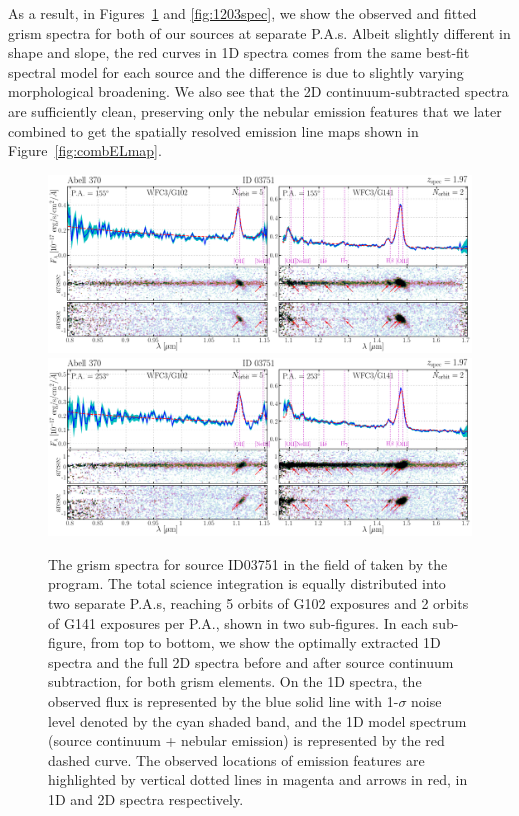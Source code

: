 As a result, in Figures~\ref{fig:3751spec} and \ref{fig:1203spec}, we show the observed and fitted grism spectra 
for both of our sources at separate P.A.s.
Albeit slightly different in shape and slope, the red curves in 1D spectra comes from the same best-fit spectral 
model for each source and the difference is due to slightly varying morphological broadening.
We also see that the 2D continuum-subtracted spectra are sufficiently clean, preserving only the nebular emission
features that we later combined to get the spatially resolved emission line maps shown in 
Figure~\ref{fig:combELmap}.

\begin{figure}
    \includegraphics[width=\textwidth]{fig/clA370_id03751_pa155_ELfig.png}
    \includegraphics[width=\textwidth]{fig/clA370_id03751_pa253_ELfig.png}
    \caption[The \hst grism spectra for source ID03751 in the field of \clsan taken by the \glass program.]
    {The \hst grism spectra for source ID03751 in the field of \clsan taken by the \glass program.
    The total science integration is equally distributed into two separate P.A.s,
    reaching 5 orbits of G102 exposures and 2 orbits of G141 exposures per P.A., shown in two sub-figures.
    In each sub-figure, from top to bottom, we show the optimally extracted 1D spectra and the full 2D spectra 
    before and after source continuum subtraction, for both grism elements.
    On the 1D spectra, the observed flux is represented by the blue solid line with 1-$\sigma$ noise level 
    denoted by the cyan shaded band, and the 1D model spectrum (source continuum + nebular emission) is 
    represented by the red dashed curve.
    The observed locations of emission features are highlighted by vertical dotted lines in magenta and arrows in 
    red, in 1D and 2D spectra respectively.
    }
    \label{fig:3751spec}
\end{figure}

